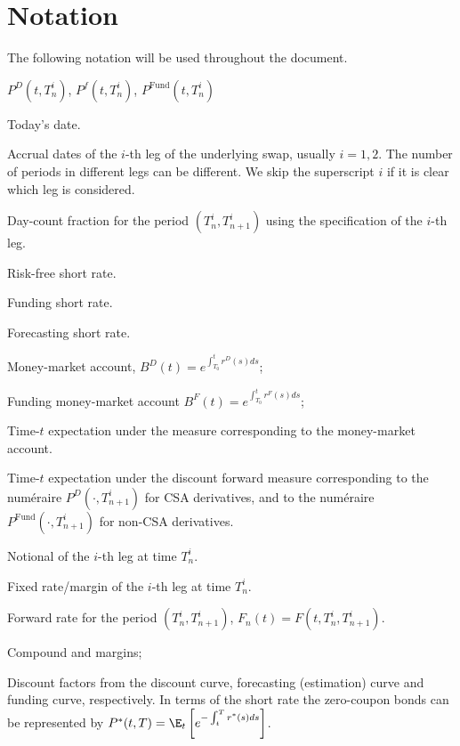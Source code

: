\documentclass[]{pmv_report} %
\begin{document}
\section{Notation}
The following notation will be used throughout the document.
\begin{deflist}{$P^D(t,T_n^i)$, $P^f(t,T_n^i)$, $P^{\text{Fund}}(t,T_n^i)$}
\item[$T_0$]
Today's date.
\item[$T_1^i,T_2^i,\hdots T_{N^i+1}^i$]
Accrual dates of the $i$-th leg of the underlying swap, usually $i=1,2$.
The number of periods in different legs can be different.
We skip the superscript $i$ if it is clear which leg is considered.
\item[$\alpha_{n}^{i}$]
Day-count fraction for the period $(T_n^i, T_{n+1}^i)$ using the specification of the $i$-th leg.
\item[$r^D(t)$]
Risk-free short rate.
\item[$r^F(t)$]
Funding short rate.
\item[$r^f(t)$]
Forecasting short rate.
\item[$B^D(t)$]
Money-market account, $B^D(t)=e^{\int_{T_0}^t r^D(s)ds}$;
\item[$B^F(t)$]
Funding money-market account $B^F(t)=e^{\int_{T_0}^t r^F(s)ds}$;
\item[$\E^{\Q}_t$]
Time-$t$ expectation under the measure corresponding to the money-market account.
\item[$\E^{n+1}_t$]
Time-$t$ expectation under the discount forward measure corresponding to the num\'eraire $P^D(\cdot,T_{n+1}^i)$ for CSA derivatives, and to the num\'eraire $P^{\text{Fund}}(\cdot,T_{n+1}^i)$ for non-CSA derivatives.
\item[$q_n^i$]
Notional of the $i$-th leg at time $T_n^i$.
\item[$k_n^i$]
Fixed rate/margin of the $i$-th leg at time $T_n^i$.
\item[$F_n(t)$]
Forward rate for the period $(T_n^i,T_{n+1}^i)$, $F_n(t)=F(t,T_n^i,T_{n+1}^i)$.
\item[$M^C,M^L$]
Compound and \Libor margins;
\item[$P^D(t,T_n^i)$, $P^f(t,T_n^i)$, $P^{\text{Fund}}(t,T_n^i)$]
Discount factors from the discount curve, forecasting (estimation) curve and funding curve, respectively.
In terms of the short rate the zero-coupon bonds can be represented by $P^*(t,T)=\E_t\left[ e^{-\int_t^T r^*(s)ds} \right]$.
\end{deflist}
\end{document}
